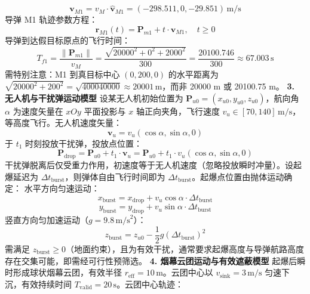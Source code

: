 \documentclass{JXUSTmodeling}
\begin{document}
\begin{equation}
\mathbf{v}_{M1} = v_M \cdot \hat{\mathbf{v}}_{M1} = (-298.511, 0, -29.851)\,\text{m/s} \tag{3}
\end{equation}
导弹 M1 轨迹参数方程：
\begin{equation}
\mathbf{r}_{M1}(t) = \mathbf{P}_{m1} + t \cdot \mathbf{v}_{M1},\quad t\geq 0 \tag{4}
\end{equation}
导弹到达假目标原点的飞行时间：
\begin{equation}
T_{f1} = \frac{\|\mathbf{P}_{m1}\|}{v_M} = \frac{\sqrt{20000^2+0^2+2000^2}}{300} = \frac{20100.746}{300} \approx 67.003\,\text{s} \tag{5}
\end{equation}
需特别注意：M1 到真目标中心 $(0,200,0)$ 的水平距离为 $\sqrt{20000^2+200^2} = \sqrt{400040000} \approx 20001\,\text{m}$，而非 20000 m 或 20100.75 m。
\textbf{3. 无人机与干扰弹运动模型}
设某无人机初始位置为 $\mathbf{P}_{u0} = (x_{u0}, y_{u0}, z_{u0})$，航向角 $\alpha$ 为速度矢量在 $xOy$ 平面投影与 $x$ 轴正向夹角，飞行速度 $v_u \in [70, 140]\,\text{m/s}$，等高度飞行。无人机速度矢量：
\begin{equation}
\mathbf{v}_u = v_u(\cos\alpha, \sin\alpha, 0) \tag{6}
\end{equation}
于 $t_1$ 时刻投放干扰弹，投放点位置：
\begin{equation}
\mathbf{P}_{\text{drop}} = \mathbf{P}_{u0} + t_1 \cdot \mathbf{v}_u = \mathbf{P}_{u0} + t_1 \cdot v_u(\cos\alpha, \sin\alpha, 0) \tag{7}
\end{equation}
干扰弹脱离后仅受重力作用，初速度等于无人机速度（忽略投放瞬时冲量）。设起爆延迟为 $\Delta t_{\text{burst}}$，则弹体自由飞行时间即为 $\Delta t_{\text{burst}}$。起爆点位置由抛体运动确定：
水平方向匀速运动：
\begin{equation}
x_{\text{burst}} = x_{\text{drop}} + v_u\cos\alpha \cdot \Delta t_{\text{burst}} \tag{8}
\end{equation}
\begin{equation}
y_{\text{burst}} = y_{\text{drop}} + v_u\sin\alpha \cdot \Delta t_{\text{burst}} \tag{9}
\end{equation}
竖直方向匀加速运动（$g = 9.8\,\text{m/s}^2$）：
\begin{equation}
z_{\text{burst}} = z_{u0} - \frac{1}{2}g(\Delta t_{\text{burst}})^2 \tag{10}
\end{equation}
需满足 $z_{\text{burst}} \geq 0$（地面约束），且为有效干扰，通常要求起爆高度与导弹航路高度存在交集可能，即需经可行性预筛选。
\textbf{4. 烟幕云团运动与有效遮蔽模型}
起爆后瞬时形成球状烟幕云团，有效半径 $r_{\text{eff}} = 10\,\text{m}$。云团中心以 $v_{\text{sink}} = 3\,\text{m/s}$ 匀速下沉，有效持续时间 $T_{\text{valid}} = 20\,\text{s}$。云团中心轨迹：
\end{document}
